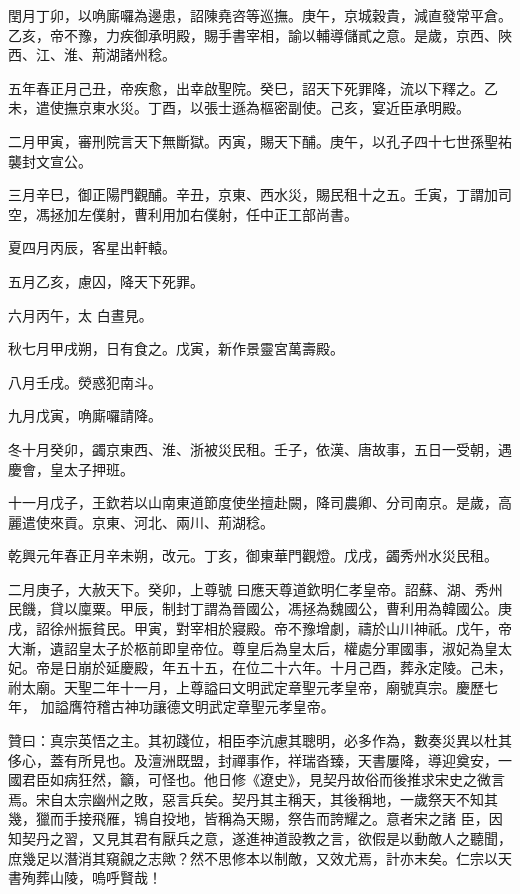 \begin{pinyinscope}
 閏月丁卯，以唃廝囉為邊患，詔陳堯咨等巡撫。庚午，京城穀貴，減直發常平倉。乙亥，帝不豫，力疾御承明殿，賜手書宰相，諭以輔導儲貳之意。是歲，京西、陜西、江、淮、荊湖諸州稔。



 五年春正月己丑，帝疾愈，出幸啟聖院。癸巳，詔天下死罪降，流以下釋之。乙未，遣使撫京東水災。丁酉，以張士遜為樞密副使。己亥，宴近臣承明殿。



 二月甲寅，審刑院言天下無斷獄。丙寅，賜天下酺。庚午，以孔子四十七世孫聖祐襲封文宣公。



 三月辛巳，御正陽門觀酺。辛丑，京東、西水災，賜民租十之五。壬寅，丁謂加司空，馮拯加左僕射，曹利用加右僕射，任中正工部尚書。



 夏四月丙辰，客星出軒轅。



 五月乙亥，慮囚，降天下死罪。



 六月丙午，太
 白晝見。



 秋七月甲戌朔，日有食之。戊寅，新作景靈宮萬壽殿。



 八月壬戌。熒惑犯南斗。



 九月戊寅，唃廝囉請降。



 冬十月癸卯，蠲京東西、淮、浙被災民租。壬子，依漢、唐故事，五日一受朝，遇慶會，皇太子押班。



 十一月戊子，王欽若以山南東道節度使坐擅赴闕，降司農卿、分司南京。是歲，高麗遣使來貢。京東、河北、兩川、荊湖稔。



 乾興元年春正月辛未朔，改元。丁亥，御東華門觀燈。戊戌，蠲秀州水災民租。



 二月庚子，大赦天下。癸卯，上尊號
 曰應天尊道欽明仁孝皇帝。詔蘇、湖、秀州民饑，貸以廩粟。甲辰，制封丁謂為晉國公，馮拯為魏國公，曹利用為韓國公。庚戌，詔徐州振貧民。甲寅，對宰相於寢殿。帝不豫增劇，禱於山川神祇。戊午，帝大漸，遺詔皇太子於柩前即皇帝位。尊皇后為皇太后，權處分軍國事，淑妃為皇太妃。帝是日崩於延慶殿，年五十五，在位二十六年。十月己酉，葬永定陵。己未，祔太廟。天聖二年十一月，上尊謚曰文明武定章聖元孝皇帝，廟號真宗。慶歷七年，
 加謚膺符稽古神功讓德文明武定章聖元孝皇帝。



 贊曰：真宗英悟之主。其初踐位，相臣李沆慮其聰明，必多作為，數奏災異以杜其侈心，蓋有所見也。及澶洲既盟，封禪事作，祥瑞沓臻，天書屢降，導迎奠安，一國君臣如病狂然，籲，可怪也。他日修《遼史》，見契丹故俗而後推求宋史之微言焉。宋自太宗幽州之敗，惡言兵矣。契丹其主稱天，其後稱地，一歲祭天不知其幾，獵而手接飛雁，鴇自投地，皆稱為天賜，祭告而誇耀之。意者宋之諸
 臣，因知契丹之習，又見其君有厭兵之意，遂進神道設教之言，欲假是以動敵人之聽聞，庶幾足以潛消其窺覦之志歟？然不思修本以制敵，又效尤焉，計亦末矣。仁宗以天書殉葬山陵，嗚呼賢哉！



\end{pinyinscope}